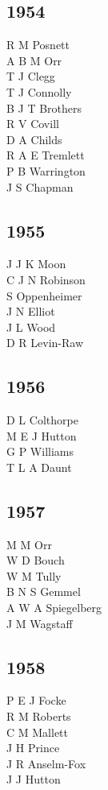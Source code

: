 \begin{multicols}{3}
  \subsection*{1954}
  R M Posnett \\
  A B M Orr \\
  T J Clegg \\
  T J Connolly \\
  B J T Brothers \\
  R V Covill \\
  D A Childs \\
  R A E Tremlett \\
  P B Warrington \\
  J S Chapman \\
  \subsection*{1955}
  J J K Moon \\
  C J N Robinson \\
  S Oppenheimer \\
  J N Elliot \\
  J L Wood \\
  D R Levin-Raw \\
  \subsection*{1956}
  D L Colthorpe \\
  M E J Hutton \\
  G P Williams \\
  T L A Daunt \\
  \subsection*{1957}
  M M Orr \\
  W D Bouch \\
  W M Tully \\
  B N S Gemmel \\
  A W A Spiegelberg \\
  J M Wagstaff \\
  \subsection*{1958}
  P E J Focke \\
  R M Roberts \\
  C M Mallett \\
  J H Prince \\
  J R Anselm-Fox \\
  J J Hutton \\

\end{multicols}
